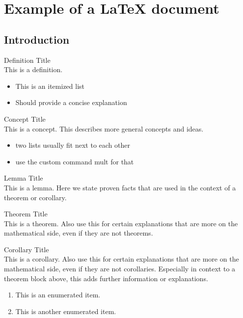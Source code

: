\section{Example of a LaTeX document}

\subsection{Introduction}


\begin{definition}{Definition Title}\\
    This is a definition.
    \begin{itemize}
        \item This is an itemized list
        \item Should provide a concise explanation
    \end{itemize}
\end{definition}

\begin{concept}{Concept Title}\\
    This is a concept. This describes more general concepts and ideas.
    \begin{itemize}
        \item two lists usually fit next to each other
        \item use the custom command mult for that 
    \end{itemize}
\end{concept}

\multend 

\begin{lemma}{Lemma Title}\\
    This is a lemma. Here we state proven facts that are used in the context of a theorem or corollary.
\end{lemma}

\begin{theorem}{Theorem Title}\\
    This is a theorem. Also use this for certain explanations that are more on the mathematical side, even if they are not theorems.
\end{theorem}

\begin{corollary}{Corollary Title}\\
    This is a corollary. Also use this for certain explanations that are more on the mathematical side, even if they are not corollaries. 
    Especially in context to a theorem block above, this adds further information or explanations.
    \begin{enumerate}
        \item This is an enumerated item.
        \item This is another enumerated item.
    \end{enumerate}
\end{corollary}

